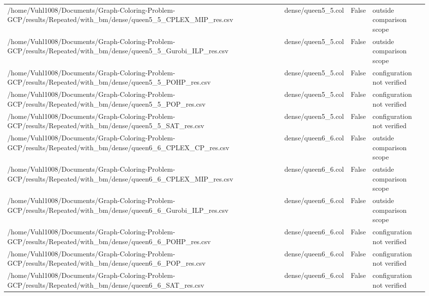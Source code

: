 \begin{table}[htbp]
\begin{tabular}{llll}
/home/Vuhl1008/Documents/Graph-Coloring-Problem-GCP/results/Repeated/with\_bm/dense/queen5\_5\_CPLEX\_MIP\_res.csv & dense/queen5\_5.col & False & outside comparison scope \\
/home/Vuhl1008/Documents/Graph-Coloring-Problem-GCP/results/Repeated/with\_bm/dense/queen5\_5\_Gurobi\_ILP\_res.csv & dense/queen5\_5.col & False & outside comparison scope \\
/home/Vuhl1008/Documents/Graph-Coloring-Problem-GCP/results/Repeated/with\_bm/dense/queen5\_5\_POHP\_res.csv & dense/queen5\_5.col & False & configuration not verified \\
/home/Vuhl1008/Documents/Graph-Coloring-Problem-GCP/results/Repeated/with\_bm/dense/queen5\_5\_POP\_res.csv & dense/queen5\_5.col & False & configuration not verified \\
/home/Vuhl1008/Documents/Graph-Coloring-Problem-GCP/results/Repeated/with\_bm/dense/queen5\_5\_SAT\_res.csv & dense/queen5\_5.col & False & configuration not verified \\
/home/Vuhl1008/Documents/Graph-Coloring-Problem-GCP/results/Repeated/with\_bm/dense/queen6\_6\_CPLEX\_CP\_res.csv & dense/queen6\_6.col & False & outside comparison scope \\
/home/Vuhl1008/Documents/Graph-Coloring-Problem-GCP/results/Repeated/with\_bm/dense/queen6\_6\_CPLEX\_MIP\_res.csv & dense/queen6\_6.col & False & outside comparison scope \\
/home/Vuhl1008/Documents/Graph-Coloring-Problem-GCP/results/Repeated/with\_bm/dense/queen6\_6\_Gurobi\_ILP\_res.csv & dense/queen6\_6.col & False & outside comparison scope \\
/home/Vuhl1008/Documents/Graph-Coloring-Problem-GCP/results/Repeated/with\_bm/dense/queen6\_6\_POHP\_res.csv & dense/queen6\_6.col & False & configuration not verified \\
/home/Vuhl1008/Documents/Graph-Coloring-Problem-GCP/results/Repeated/with\_bm/dense/queen6\_6\_POP\_res.csv & dense/queen6\_6.col & False & configuration not verified \\
/home/Vuhl1008/Documents/Graph-Coloring-Problem-GCP/results/Repeated/with\_bm/dense/queen6\_6\_SAT\_res.csv & dense/queen6\_6.col & False & configuration not verified \\
\hline
\end{tabular}
\end{table}

